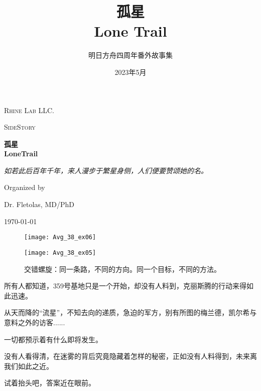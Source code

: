 \documentclass[openany]{book}
\title{孤星\\Lone Trail}
\author{明日方舟四周年番外故事集}
\date{2023年5月}
\def\blankpage{
      \clearpage
      \thispagestyle{empty}
      \addtocounter{page}{-1}
      \null
      \clearpage}
\begin{document}
\frontmatter
\maketitle
\thispagestyle{empty}
\begin{titlepage}
    \centering
    {\LARGE \textsc{Rhine Lab LLC.}\par}
    \vspace{1cm}
    {\Large \textsc{SideStory}\par}
    \vspace{1.5cm}
    {\huge\bfseries 孤星\\LoneTrail \par}
    \vspace{2cm}
    {\Large\itshape 如若此后百年千年，来人漫步于繁星身侧，人们便要赞颂她的名。\par}
    \vfill
    Organized by\par
    Dr. Fletolas, MD/PhD
    \vfill
    {\large \today\par}
\end{titlepage}

\begin{figure}[h]
    \centering \caption*{孤星：不灭。}
    \centering \texttt{[image: Avg\_38\_ex06]}
    \centering \caption*{交错螺旋：同一条路，不同的方向。同一个目标，不同的方法。}
    \centering \texttt{[image: Avg\_38\_ex05]}
\end{figure}
\thispagestyle{empty}
\clearpage
{}
\begin{center}
    \begin{minipage}{.6\textwidth}
        \begin{center}
            所有人都知道，359号基地只是一个开始，却没有人料到，克丽斯腾的行动来得如此迅速。 \par
            从天而降的“流星”，不知去向的递质，急迫的军方，别有所图的梅兰德，凯尔希与意料之外的访客...... \par
            一切都预示着有什么即将发生。 \par
            没有人看得清，在迷雾的背后究竟隐藏着怎样的秘密，正如没有人料得到，未来离我们如此之近。 \par
            试着抬头吧，答案近在眼前。
        \end{center}
    \end{minipage}
\end{center}
\thispagestyle{empty}
\blankpage
\thispagestyle{empty}
\tableofcontents
\thispagestyle{empty}
\blankpage
\thispagestyle{empty}
\end{document}
